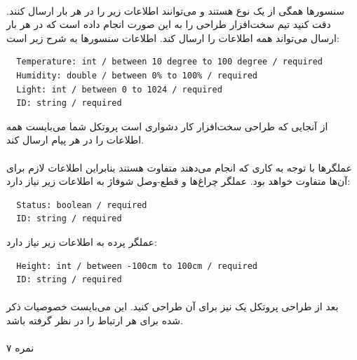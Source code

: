 \documentclass[../main.tex]{subfiles}
\begin{document}
\paragraph{}
سنسورها همگی از یک نوع هستند و می‌توانند اطلاعات زیر را در هر بار ارسال کنند.
دقت کنید تیم سخت‌افزار طراحی را به این صورت انجام داده است که در هر بار ارسال می‌تواند همه اطلاعات را ارسال کند.
اطلاعات سنسورها به شرح زیر است:

\begin{latin}
\begin{lstlisting}
  Temperature: int / between 10 degree to 100 degree / required
  Humidity: double / between 0% to 100% / required
  Light: int / between 0 to 1024 / required
  ID: string / required
\end{lstlisting}
\end{latin}

از آنجایی که طراحی سخت‌افزار کار دشواری است پروتکل شما می‌بایست همه اطلاعات را در هر پیام ارسال کند.

\paragraph{}
عملگرها با توجه به کاری که انجام می‌دهند متفاوت هستند بنابراین اطلاعات لازم برای آن‌ها متفاوت خواهد بود.
عملگر چراغ‌ها و قطع-وصل شوفاژ به اطلاعات زیر نیاز دارد:

\begin{latin}
\begin{lstlisting}
  Status: boolean / required
  ID: string / required
\end{lstlisting}
\end{latin}

عملگر پرده به اطلاعات زیر نیاز دارد:

\begin{latin}
\begin{lstlisting}
  Height: int / between -100cm to 100cm / required
  ID: string / required
\end{lstlisting}
\end{latin}

\paragraph{}
بعد از طراحی پروتکل یک  نیز برای آن طراحی کنید.
این  می‌بایست خصوصیات ذکر شده برای هر ارتباط را در نظر گرفته باشد.

\paragraph{}
۷ نمره
\end{document}
